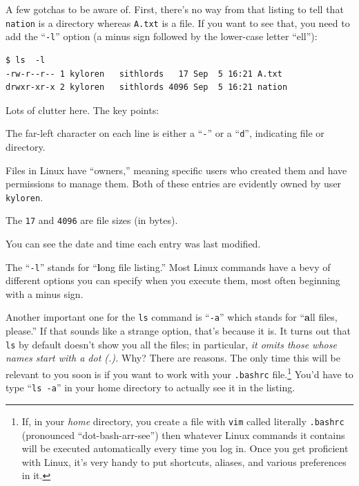 \begin{enumerate}
A few gotchas to be aware of. First, there's no way from that listing to
tell that \texttt{nation} is a directory whereas \texttt{A.txt} is a file. If
you want to see that, you need to add the ``\texttt{-l}'' option (a minus sign
followed by the lower-case letter ``ell''):

\begin{Verbatim}[fontsize=\small]
$ ls  -l
-rw-r--r-- 1 kyloren   sithlords   17 Sep  5 16:21 A.txt
drwxr-xr-x 2 kyloren   sithlords 4096 Sep  5 16:21 nation
\end{Verbatim}

Lots of clutter here. The key points:

\begin{compactitem}[-]
\item The far-left character on each line is either a ``\texttt{-}'' or a
``\texttt{d}'', indicating file or directory.
\item Files in Linux have ``owners,'' meaning specific users who created them
and have permissions to manage them. Both of these entries are evidently owned
by user \texttt{kyloren}.
\item The \texttt{17} and \texttt{4096} are file sizes (in bytes).
\item You can see the date and time each entry was last modified.
\end{compactitem}

The ``\texttt{-l}'' stands for ``\textbf{l}ong file listing.'' Most Linux
commands have a bevy of different options you can specify when you execute
them, most often beginning with a minus sign.

Another important one for the \texttt{ls} command is ``\texttt{-a}'' which
stands for ``\textbf{a}ll files, please.'' If that sounds like a strange
option, that's because it is. It turns out that \texttt{ls} by default doesn't
show you all the files; in particular, \textit{it omits those whose names start
with a dot (.).} Why? There are reasons. The only time this will be relevant to
you soon is if you want to work with your \texttt{.bashrc} file.\footnote{If,
in your \textit{home} directory, you create a file with \texttt{vim} called
literally \texttt{.bashrc} (pronounced ``dot-bash-arr-see'') then whatever
Linux commands it contains will be executed automatically every time you log
in. Once you get proficient with Linux, it's very handy to put shortcuts,
aliases, and various preferences in it.} You'd have to type ``\texttt{ls -a}''
in your home directory to actually see it in the listing.



\end{enumerate}
